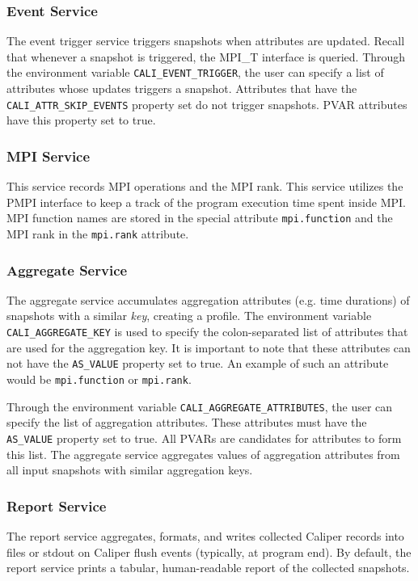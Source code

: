 \subsubsection{Event Service}
The event trigger service triggers snapshots when attributes are updated. Recall that whenever a snapshot is triggered, the MPI\_T interface is queried. Through the environment variable \verb+CALI_EVENT_TRIGGER+, the user can specify a list of attributes whose updates triggers a snapshot. Attributes that have the \verb+CALI_ATTR_SKIP_EVENTS+ property set do not trigger snapshots. PVAR attributes have this property set to true.
\subsubsection{MPI Service}
This service records MPI operations and the MPI rank. This service utilizes the PMPI interface to keep a track of the program execution time spent inside MPI. MPI function names are stored in the special attribute \verb+mpi.function+ and the MPI rank in the \verb+mpi.rank+ attribute.
\subsubsection{Aggregate Service}
The aggregate service accumulates aggregation attributes (e.g. time durations) of snapshots with a similar \textit{key}, creating a profile. The environment variable \verb+CALI_AGGREGATE_KEY+ is used to specify the colon-separated list of attributes that are used for the aggregation key. It is important to note that these attributes can not have the \verb+AS_VALUE+ property set to true. An example of such an attribute would be \verb+mpi.function+ or \verb+mpi.rank+.
\par Through the environment variable \verb+CALI_AGGREGATE_ATTRIBUTES+, the user can specify the list of aggregation attributes. These attributes must have the \verb+AS_VALUE+ property set to true. All PVARs are candidates for attributes to form this list. The aggregate service aggregates values of aggregation attributes from all input snapshots with similar aggregation keys.
\subsubsection{Report Service}
The report service aggregates, formats, and writes collected Caliper records into files or stdout on Caliper flush events (typically, at program end). By default, the report service prints a tabular, human-readable report of the collected snapshots.

